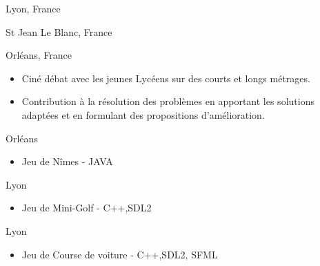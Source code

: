 \documentclass[10pt,a4paper]{altacv}
\begin{document}
\divider

 {Lyon, France}
\divider

 {St Jean Le Blanc, France}
\divider


 { Orléans, France}
\begin{itemize}
\item Ciné débat avec les jeunes Lycéens sur des courts et longs
métrages.
\item Contribution à la résolution des problèmes en apportant les
solutions adaptées et en formulant des propositions d'amélioration.
\end{itemize}
\divider
{}
 {Orléans}
\begin{itemize}
\item Jeu de Nîmes - JAVA
\end{itemize}

 {Lyon}
\begin{itemize}
\item Jeu de Mini-Golf - C++,SDL2
\end{itemize}

 {Lyon}
\begin{itemize}
\item Jeu de Course de voiture - C++,SDL2, SFML
\end{itemize}
\end{document}
